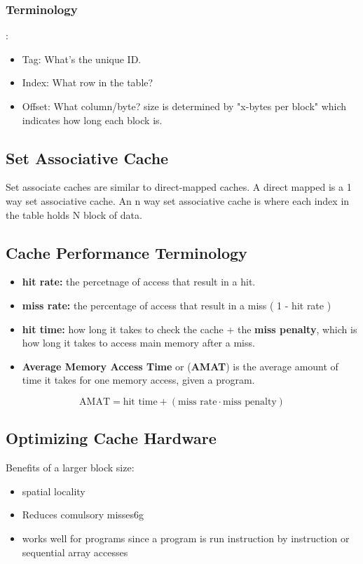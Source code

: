 \documentclass[12pt]{article}
\begin{document}
\subsubsection*{Terminology}:
\begin{itemize}
    \item Tag: What's the unique ID.
    \item Index: What row in the table?
    \item Offset: What column/byte? size is determined by "x-bytes per block" which indicates how long each block is.
\end{itemize}


\subsection*{Set Associative Cache}
Set associate caches are similar to direct-mapped caches. A direct mapped is a 1 way set associative cache.
An n way set associative cache is where each index in the table holds N block of data.


\subsection*{Cache Performance Terminology}
\begin{itemize}
    \item \textbf{hit rate:} the percetnage of access that result in a hit.
    \item \textbf{miss rate:} the percentage of access that result in a miss ( 1 - hit rate )
    \item \textbf{hit time:} how long it takes to check the cache + the \textbf{miss penalty}, which is how long it takes to access main memory after a miss.
    \item \textbf{Average Memory Access Time} or (\textbf{AMAT}) is the average amount of time it takes for one memory access, given a program.
\end{itemize}

$$ \text{AMAT} = \text{hit time} + (\text{miss rate} \cdot \text{miss penalty}) $$

\subsection*{Optimizing Cache Hardware}
Benefits of a larger block size:
\begin{itemize}
    \item spatial locality
    \item Reduces comulsory misses6g
    \item works well for programs since a program is run instruction by instruction or sequential array accesses
\end{itemize}
\end{document}
